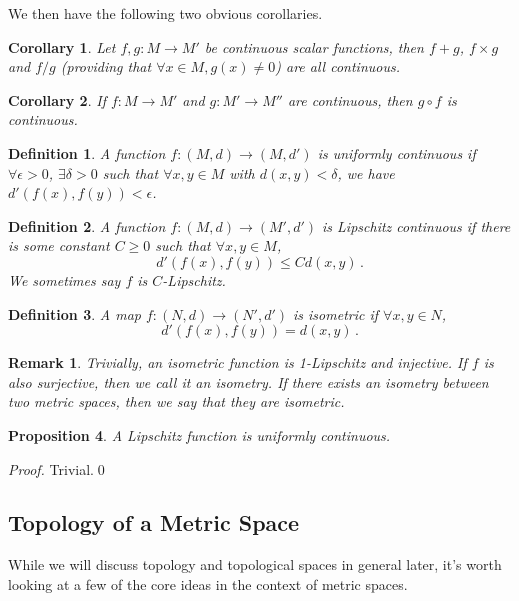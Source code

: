 \documentclass{article}
\theoremstyle{plain}\theoremheaderfont{\normalfont\itshape}\theorembodyfont{\rmfamily}\theoremseparator{.}\newtheorem*{rem}{Remark}\newtheorem*{ex}{Example}\newtheorem*{proof}{Proof}\newtheorem*{altp}{Alternative proof}
\theoremstyle{plain}\theoremheaderfont{\normalfont\bfseries}\theorembodyfont{\rmfamily}\theoremseparator{.}\newtheorem{thm}{Theorem}[section]\newtheorem{lem}[thm]{Lemma}\newtheorem{prop}[thm]{Proposition}\newtheorem*{cor}{Corollary}\newtheorem{defn}[thm]{Definition}\newtheorem{clm}[thm]{Claim}\newtheorem{clminproof}{Claim}
\theoremstyle{break}\theoremheaderfont{\normalfont\itshape}\theorembodyfont{\rmfamily}\theoremseparator{.\medskip}\newtheorem*{proofskip}{Proof}\newtheorem*{exs}{Examples}\newtheorem*{rems}{Remarks}
\theoremstyle{break}\theoremheaderfont{\normalfont\bfseries}\theorembodyfont{\rmfamily}\theoremseparator{.\medskip}\newtheorem{lemskip}[thm]{Lemma}\newtheorem{defnskip}[thm]{Definition}\newtheorem{propskip}[thm]{Proposition}\newtheorem{thmskip}[thm]{Theorem}
\newcommand{\qed}{\hfill\ensuremath{\Box}}
\begin{document}
    We then have the following two obvious corollaries.
    \begin{cor}
        Let \(f,g:M\to M'\) be continuous scalar functions, then \(f+g\), \(f\times g\) and \(f/g\) (providing that \(\forall x\in M, g(x)\ne 0\)) are all continuous.
    \end{cor}
    \begin{cor}
        If \(f:M\to M'\) and \(g:M'\to M''\) are continuous, then \(g\circ f\) is continuous.
    \end{cor}

    \begin{defn}
        A function \(f:(M,d)\to(M,d')\) is \textit{uniformly continuous} if \(\forall \epsilon>0\), \(\exists\delta>0\) such that \(\forall x,y\in M\) with \(d(x,y)<\delta\), we have \(d'(f(x),f(y))<\epsilon\).
    \end{defn}

    \begin{defn}
        A function \(f:(M,d)\to(M',d')\) is \textit{Lipschitz continuous} if there is some constant \(C\ge 0\) such that \(\forall x,y\in M\),
        \[d'(f(x),f(y))\le Cd(x,y)\,.\]
        We sometimes say \(f\) is \textit{\(C\)-Lipschitz}.
    \end{defn}

    \begin{defn}
        A map \(f:(N,d)\to (N',d')\) is \textit{isometric} if \(\forall x,y\in N\),
        \[d'(f(x),f(y))=d(x,y)\,.\]
    \end{defn}

    \begin{rem}
        Trivially, an isometric function is 1-Lipschitz and injective. If \(f\) is also surjective, then we call it an \textit{isometry}. If there exists an isometry between two metric spaces, then we say that they are \textit{isometric}.
    \end{rem}

    \begin{prop}
        A Lipschitz function is uniformly continuous.
    \end{prop}
    \begin{proof}
        Trivial.\qed
    \end{proof}
    \subsection{Topology of a Metric Space}
    While we will discuss topology and topological spaces in general later, it's worth looking at a few of the core ideas in the context of metric spaces.
\end{document}
